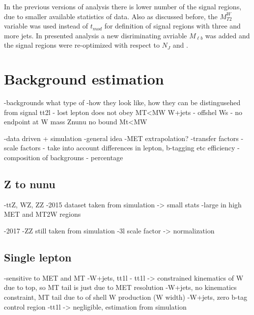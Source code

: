 In the previous versions of analysis there is lower number of the signal regions, due to smaller available statistics of data. Also as discussed before, the $M_{T2}^{W}$ variable was used instead of $t_{mod}$ for definition of signal regions with three and more jets. In presented analysis a new disriminating avriable $M_{\ell b}$ was added and the signal regions were re-optimized with respect to $N_{J}$ and \MET .





\section{Background estimation}

-backgrounds 
	what type of
-how they look like, how they can be distingusehed from signal
	tt2l - lost lepton does not obey MT<MW
	W+jets - offshel Ws - no endpoint at W mass
	Znunu no bound Mt<MW

-data driven + simulation
-general idea
-MET extrapolation?
-transfer factors
-scale factors - take into account differences in lepton, b-tagging etc efficiency
-composition of backgrouns - percentage

\subsection{Z to nunu}

-ttZ, WZ, ZZ
-2015 dataset taken from simulation -> small stats
-large in high MET and MT2W regions

-2017
-ZZ still taken from simulation
-3l scale factor -> normalization

\subsection{Single lepton}

-sensitive to MET and MT
-W+jets, tt1l
- tt1l -> constrained kinematics of W due to top, so MT tail is just due to MET resolution
-W+jets, no kinematics constraint, MT tail due to of shell W production (W width) 
-W+jets, zero b-tag control region
-tt1l -> negligible, estimation from simulation

